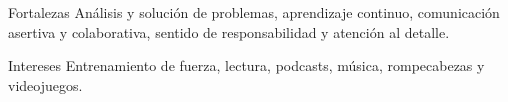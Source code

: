 
\inforow
{Fortalezas}
{Análisis y solución de problemas, aprendizaje continuo, comunicación asertiva y colaborativa, sentido de responsabilidad y atención al detalle.}

\inforow
{Intereses}
{Entrenamiento de fuerza, lectura, podcasts, música, rompecabezas y videojuegos.}
